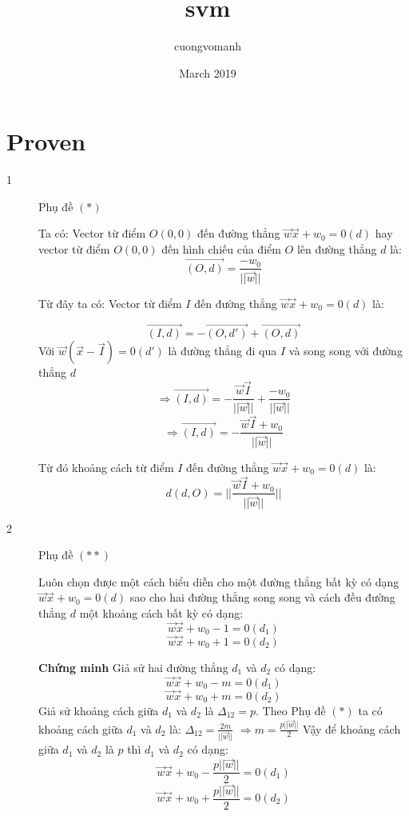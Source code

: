 \documentclass{article}
\title{svm}
\author{cuongvomanh}
\date{March 2019}
\begin{document}
    \section{Proven}
    \begin{description}
        \item[1] Phụ đề $(*)$
          
        Ta có:
        Vector từ điểm $O(0,0)$ đến đường thẳng $\vec{w}\vec{x} + w_0 = 0 (d)$ 
        hay vector từ điểm $O(0,0)$ đến hình chiếu của điểm $O$ lên 
        đường thẳng $d$ là:
        $$\vec{(O,d)} = \frac{-w_0}{||\vec{w}||}$$

        Từ đây ta có:
        Vector từ điểm $I$ đến đường thẳng $\vec{w}\vec{x} + w_0 = 0 (d)$ là:
        
        $$\vec{(I,d)} = -\vec{(O,d')} + \vec{(O,d)}$$
        Với $\vec{w}(\vec{x} - \vec{I}) = 0 (d')$ 
        là đường thẳng đi qua $I$ và song song với đường thẳng $d$
        $$\Rightarrow \vec{(I,d)} = -\frac{\vec{w}\vec{I}}{||\vec{w}||} +  \frac{-w_0}{||\vec{w}||}$$
        $$\Rightarrow \vec{(I,d)} = -\frac{\vec{w}\vec{I}+w_0}{||\vec{w}||}$$

        Từ đó khoảng cách từ điểm $I$ đến đường thẳng $\vec{w}\vec{x} + w_0 = 0 (d)$ là:
        $$d(d,O) = ||\frac{\vec{w}\vec{I}+w_0}{||\vec{w}||}|| $$
        

        \item [2] Phụ đề $(**)$
        
        Luôn chọn được một cách biểu diễn cho một đường thẳng bất kỳ
        có dạng $\vec{w}\vec{x} + w_0 = 0 (d)$ sao cho hai đường thẳng song song 
        và cách đều đường thẳng $d$ một khoảng cách bất kỳ có dạng:
        $$\vec{w}\vec{x} + w_0 - 1 = 0 (d_1)$$
        $$\vec{w}\vec{x} + w_0 + 1 = 0 (d_2)$$

        \textbf{Chứng minh} \newline
        Giả sử hai đường thẳng $d_1$ và $d_2$ có dạng:
        $$\vec{w}\vec{x} + w_0 - m = 0 (d_1)$$
        $$\vec{w}\vec{x} + w_0 + m = 0 (d_2)$$
        Giả sử khoảng cách giữa $d_1$ và $d_2$ là $\Delta _{12}=p$.
        Theo Phụ đề $(*)$ ta có khoảng cách giữa $d_1$ và $d_2$ là:
        $\Delta _{12} = \frac{2m}{||\vec{w}||}$ 
        $\Rightarrow m = \frac{p||\vec{w}||}{2}$
        Vậy để khoảng cách giữa $d_1$ và $d_2$ là $p$ thì $d_1$ và 
        $d_2$ có dạng:
        $$\vec{w}\vec{x} + w_0 - \frac{p||\vec{w}||}{2} = 0 (d_1)$$
        $$\vec{w}\vec{x} + w_0 + \frac{p||\vec{w}||}{2} = 0 (d_2)$$


\end{description}
\end{document}
